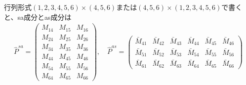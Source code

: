 \documentclass[11pt]{easymemo}
\begin{document}
行列形式$(1,2,3,4,5,6)\times(4,5,6)$または$(4,5,6)\times(1,2,3,4,5,6)$で書くと、sa成分とas成分は
\begin{align}
\hat{P}^{sa}=\begin{pmatrix}
M_{14} & M_{15} & M_{16} \\
M_{24} & M_{25} & M_{26} \\
M_{34} & M_{35} & M_{36} \\
M_{44} & M_{45} & M_{46} \\
M_{54} & M_{55} & M_{56} \\
M_{64} & M_{65} & M_{66}
\end{pmatrix},
\quad
\hat{P}^{as}=\begin{pmatrix}
\bar{M}_{41} & \bar{M}_{42} & \bar{M}_{43} & \bar{M}_{44} & \bar{M}_{45} & \bar{M}_{46} \\
\bar{M}_{51} & \bar{M}_{52} & \bar{M}_{53} & \bar{M}_{54} & \bar{M}_{55} & \bar{M}_{56} \\
\bar{M}_{61} & \bar{M}_{62} & \bar{M}_{63} & \bar{M}_{64} & \bar{M}_{65} & \bar{M}_{66}
\end{pmatrix}
\end{align}
\end{document}
